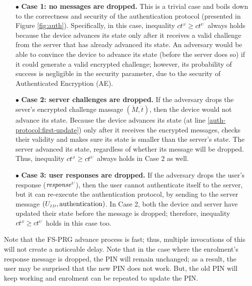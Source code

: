 \begin{itemize}
%
\item[$\bullet$] \textbf{Case 1: no messages are dropped.} This is a trivial case and boils down to the correctness and security of the authentication protocol  (presented in Figure \ref{fig:auth}). Specifically, in this case, inequality  ${ct}^{\scriptscriptstyle S} \geq {ct}^{\scriptscriptstyle U}$ always holds because the device advances its state only after it receives a valid challenge from the server that has already advanced its state. An adversary would be able to convince the device to advance its state (before the server does so) if it could generate a valid encrypted challenge; however, its probability of success is negligible in the security parameter, due to the security of Authenticated Encryption (AE). 
%
\item[$\bullet$] \textbf{Case 2: server challenges are dropped.} If the adversary drops the sever's encrypted challenge massage $(\ddot M, \ddot t)$, then the device would not advance its state. Because the device advances its state (at line \ref{auth-protocol:first-update}) only after it receives the encrypted messages, checks their validity and makes sure its state is smaller than the server's state. The server advanced its state, regardless of whether its message will be dropped. Thus, inequality  ${ct}^{\scriptscriptstyle S} \geq {ct}^{\scriptscriptstyle U}$ always holds in Case 2 as well. 
%
\item[$\bullet$] \textbf{Case 3: user responses are dropped.} If the adversary drops the user's response (\ie $\mathit{response}^{\scriptscriptstyle U}$), then the user cannot authenticate itself to the server, but it can re-execute the authentication protocol, by sending to the server message $(U_{\scriptscriptstyle ID}, \text{authentication})$. In Case 2, both the device and server have updated their state before the message is dropped; therefore, inequality ${ct}^{\scriptscriptstyle S} \geq {ct}^{\scriptscriptstyle U}$  holds in this case too.   
%
\end{itemize}







Note that 
the FS-PRG advance process is fast; thus,  multiple invocations of this will not create a noticeable delay.
%
 Note that in the case where the enrolment's response message is dropped, the PIN will remain unchanged; as a result,  the user may be surprised that the new PIN does not work. But, the old PIN will keep working and enrolment can be repeated to update the PIN.
